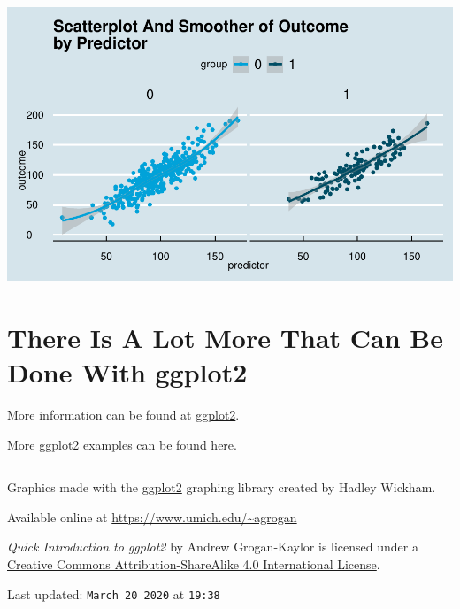 \documentclass[12pt,]{article}
\begin{document}
\includegraphics{introduction-to-ggplot2_files/figure-latex/unnamed-chunk-33-1.pdf}

\hypertarget{there-is-a-lot-more-that-can-be-done-with-ggplot2}{%
\section{There Is A Lot More That Can Be Done With
ggplot2}\label{there-is-a-lot-more-that-can-be-done-with-ggplot2}}

More information can be found at
\href{https://ggplot2.tidyverse.org/}{ggplot2}.

More ggplot2 examples can be found
\href{https://agrogan1.github.io/dataviz/how-to-choose-a-chart/how-to-choose-a-chart-v3.html}{here}.

\begin{center}\rule{0.5\linewidth}{\linethickness}\end{center}

Graphics made with the \href{https://ggplot2.tidyverse.org/}{ggplot2}
graphing library created by Hadley Wickham.

Available online at \url{https://www.umich.edu/~agrogan}

\emph{Quick Introduction to ggplot2} by Andrew Grogan-Kaylor is licensed
under a \href{http://creativecommons.org/licenses/by-sa/4.0/}{Creative
Commons Attribution-ShareAlike 4.0 International License}.

Last updated: \texttt{March\ 20\ 2020} at \texttt{19:38}
\end{document}
